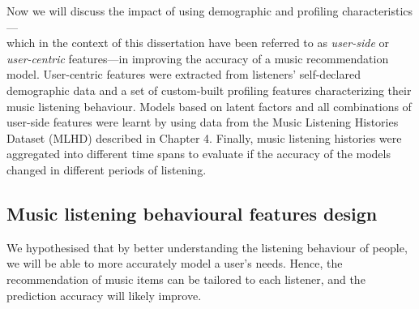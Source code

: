 Now we will discuss the impact of using demographic and profiling characteristics---\\which in the context of this dissertation have been referred to as \emph{user-side} or \emph{user-centric} features---in improving the accuracy of a music recommendation model.
User-centric features were extracted from listeners' self-declared demographic data and a set of custom-built profiling features characterizing their music listening behaviour. 
Models based on latent factors and all combinations of user-side features were learnt by using data from the Music Listening Histories Dataset (MLHD) described in Chapter 4.
Finally, music listening histories were aggregated into different time spans to evaluate if the accuracy of the models changed in different periods of listening. 





\subsection{Music listening behavioural features design}\label{sub:ch6-profiling-features-design}
We hypothesised that by better understanding the listening behaviour of people, we will be able to more accurately model a user's needs. Hence, the recommendation of music items can be tailored to each listener, and the prediction accuracy will likely improve. 
    
